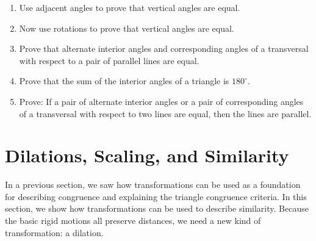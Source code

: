 %
%
%
%
%


\begin{problems}
\begin{enumerate}
\item Use adjacent angles to prove that vertical angles are equal.    
\item Now use rotations to prove that vertical angles are equal.

\item Prove that alternate interior angles and corresponding angles of a transversal with respect to a pair of parallel lines are equal.
\item Prove that the sum of the interior angles of a triangle is $180^\circ$.
\item Prove: If a pair of alternate interior angles or a pair of corresponding angles of a transversal with respect to two lines are equal, then the lines are parallel.
\end{enumerate}
\end{problems}


\section{Dilations, Scaling, and Similarity}
In a previous section, we saw how transformations can be used as a foundation for describing congruence and explaining the triangle congruence criteria.  In this section, we show how transformations can be used to describe similarity.  Because the basic rigid motions all preserve distances, we need a new kind of transformation:  a dilation. 

